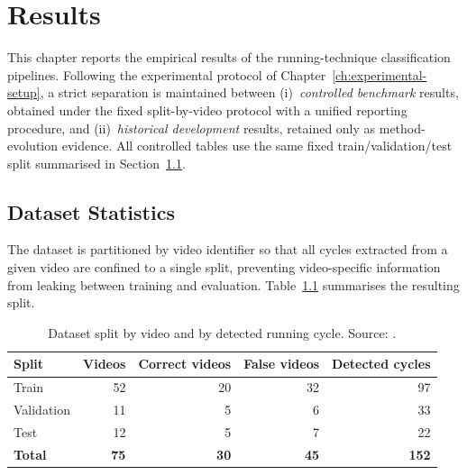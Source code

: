 
\chapter{Results}
\label{ch:results}

This chapter reports the empirical results of the running-technique
classification pipelines. Following the experimental protocol of
Chapter~\ref{ch:experimental-setup}, a strict separation is maintained
between (i)~\emph{controlled benchmark} results, obtained under the fixed
split-by-video protocol with a unified reporting procedure, and
(ii)~\emph{historical development} results, retained only as method-evolution
evidence. All controlled tables use the same fixed train/validation/test
split summarised in Section~\ref{sec:dataset-stats}.

\section{Dataset Statistics}
\label{sec:dataset-stats}

The dataset is partitioned by video identifier so that all cycles extracted
from a given video are confined to a single split, preventing video-specific
information from leaking between training and evaluation. Table~\ref{tab:split}
summarises the resulting split.

\begin{table}[htbp]
\centering
\caption[Dataset split by video and by detected running cycle. Source: \protect{}.]{Dataset split by video and by detected running cycle. Source: .}
\label{tab:split}
\tablefont
\begin{tabularx}{\textwidth}{X r r r r}
\toprule
\textbf{Split} & \textbf{Videos} & \textbf{Correct videos} & \textbf{False videos} & \textbf{Detected cycles} \\
\midrule
Train       & 52 & 20 & 32 & 97  \\
Validation  & 11 &  5 &  6 & 33  \\
Test        & 12 &  5 &  7 & 22  \\
\midrule
\textbf{Total} & \textbf{75} & \textbf{30} & \textbf{45} & \textbf{152} \\
\bottomrule
\end{tabularx}
\end{table}

